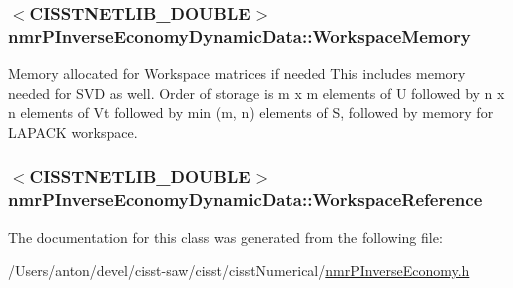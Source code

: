 \subsubsection[{Workspace\+Memory}]{$<$C\+I\+S\+S\+T\+N\+E\+T\+L\+I\+B\+\_\+\+D\+O\+U\+B\+L\+E$>$ nmr\+P\+Inverse\+Economy\+Dynamic\+Data\+::\+Workspace\+Memory\hspace{0.3cm}{\ttfamily [protected]}}\label{classnmr_p_inverse_economy_dynamic_data_a8173778ec72de535c484ae4c4e67b5ad}
Memory allocated for Workspace matrices if needed This includes memory needed for S\+V\+D as well. Order of storage is m x m elements of U followed by n x n elements of Vt followed by min (m, n) elements of S, followed by memory for L\+A\+P\+A\+C\+K workspace. \hypertarget{classnmr_p_inverse_economy_dynamic_data_a251cd42a2dcacbaa6920a08130026bf3}{}
\subsubsection[{Workspace\+Reference}]{$<$C\+I\+S\+S\+T\+N\+E\+T\+L\+I\+B\+\_\+\+D\+O\+U\+B\+L\+E$>$ nmr\+P\+Inverse\+Economy\+Dynamic\+Data\+::\+Workspace\+Reference\hspace{0.3cm}{\ttfamily [protected]}}\label{classnmr_p_inverse_economy_dynamic_data_a251cd42a2dcacbaa6920a08130026bf3}


The documentation for this class was generated from the following file\+:\begin{DoxyCompactItemize}
\item 
/\+Users/anton/devel/cisst-\/saw/cisst/cisst\+Numerical/\hyperlink{nmr_p_inverse_economy_8h}{nmr\+P\+Inverse\+Economy.\+h}\end{DoxyCompactItemize}
